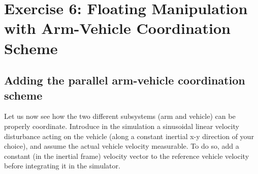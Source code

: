 	\section{Exercise 6: Floating Manipulation with Arm-Vehicle Coordination Scheme}
	\subsection{Adding the parallel arm-vehicle coordination scheme}
	\question
	Let us now see how the two different subsystems (arm and vehicle) can be
	properly coordinate. Introduce in the simulation a sinusoidal linear
	velocity disturbance acting on the vehicle (along a constant inertial
	x-y direction of your choice), and assume the actual vehicle velocity
	measurable. To do so, add a constant (in the inertial frame) velocity
	vector to the reference vehicle velocity before integrating it in the
	simulator.

